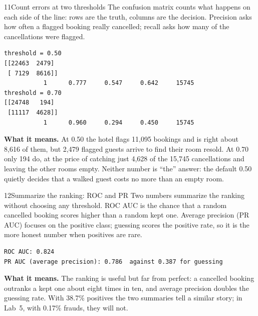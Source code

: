 \begin{labquestion}{11}{Count errors at two thresholds}
The confusion matrix counts what happens on each side of the line: rows are the truth, columns are the decision. Precision asks how often a flagged booking really cancelled; recall asks how many of the cancellations were flagged.
\end{labquestion}
\begin{labanswer}

\begin{refoutput}
\begin{lstlisting}[style=utpterminal]
threshold = 0.50
[[22463  2479]
 [ 7129  8616]]
           1      0.777     0.547     0.642     15745
threshold = 0.70
[[24748   194]
 [11117  4628]]
           1      0.960     0.294     0.450     15745
\end{lstlisting}
\end{refoutput}

\textbf{What it means.} At 0.50 the hotel flags 11,095 bookings and is right about 8,616 of them, but 2,479 flagged guests arrive to find their room resold. At 0.70 only 194 do, at the price of catching just 4,628 of the 15,745 cancellations and leaving the other rooms empty. Neither number is ``the'' answer: the default 0.50 quietly decides that a walked guest costs no more than an empty room.
\end{labanswer}

\begin{labquestion}{12}{Summarize the ranking: ROC and PR}
Two numbers summarize the ranking without choosing any threshold. ROC AUC is the chance that a random cancelled booking scores higher than a random kept one. Average precision (PR AUC) focuses on the positive class; guessing scores the positive rate, so it is the more honest number when positives are rare.
\end{labquestion}
\begin{labanswer}

\begin{refoutput}
\begin{lstlisting}[style=utpterminal]
ROC AUC: 0.824
PR AUC (average precision): 0.786  against 0.387 for guessing
\end{lstlisting}
\end{refoutput}

\textbf{What it means.} The ranking is useful but far from perfect: a cancelled booking outranks a kept one about eight times in ten, and average precision doubles the guessing rate. With 38.7\% positives the two summaries tell a similar story; in Lab~5, with 0.17\% frauds, they will not.
\end{labanswer}

